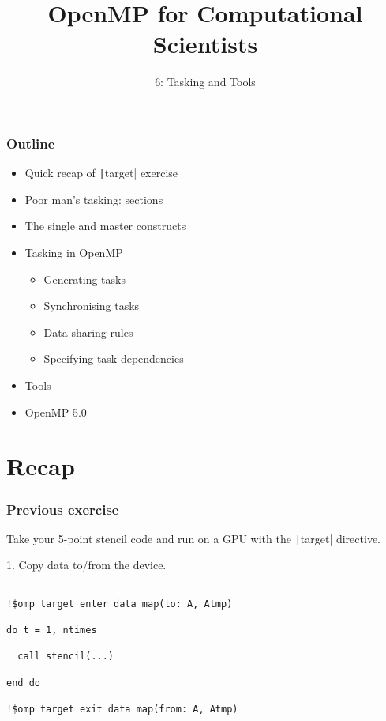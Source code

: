 \documentclass{beamer}
\title{OpenMP for Computational Scientists}
\subtitle{6: Tasking and Tools}
\begin{document}
\frame{\titlepage}

\begin{frame}
\frametitle{Outline}

\begin{itemize}
  \item Quick recap of \texttt|target| exercise
\end{itemize}

\begin{itemize}
  \item Poor man's tasking: sections
  \item The single and master constructs
  \item Tasking in OpenMP
  \begin{itemize}
    \item Generating tasks
    \item Synchronising tasks
    \item Data sharing rules
    \item Specifying task dependencies
  \end{itemize}

  \item Tools
  \item OpenMP 5.0
\end{itemize}
\end{frame}

\section{Recap}
\begin{frame}[fragile]
\frametitle{Previous exercise}

Take your 5-point stencil code and run on a GPU with the \texttt|target| directive.

1. Copy data to/from the device.
\begin{verbatim}

!$omp target enter data map(to: A, Atmp)

do t = 1, ntimes

  call stencil(...)

end do

!$omp target exit data map(from: A, Atmp)
\end{verbatim}

\end{frame}
\end{document}
